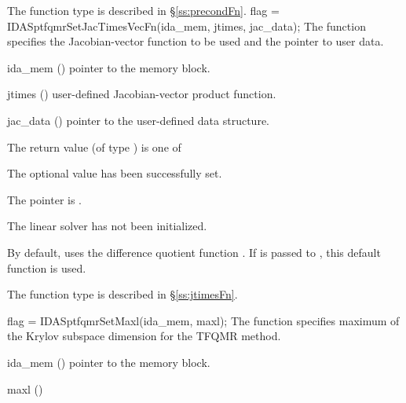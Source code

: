 {{   The function type  is described in \S\ref{ss:precondFn}.
}
{
  flag = IDASptfqmrSetJacTimesVecFn(ida\_mem, jtimes, jac\_data);
}
{
  The function  specifies the Jacobian-vector 
  function to be used and the pointer to user data.
}
{
  \begin{args}
  \item[ida\_mem] ()
    pointer to the {\ida} memory block.
  \item[jtimes] ()
    user-defined Jacobian-vector product function.
  \item[jac\_data] ()
     pointer to the user-defined data structure.
  \end{args}
}
{
  The return value  (of type ) is one of
  \begin{args}
  \item[\Id{IDASPTFQMR\_SUCCESS}] 
    The optional value has been successfully set.
  \item[\Id{IDASPTFQMR\_MEM\_NULL}]
    The  pointer is .
  \item[\Id{IDASPTFQMR\_LMEM\_NULL}]
    The {\idasptfqmr} linear solver has not been initialized.
  \end{args}
}
{
  By default, {\idasptfqmr} uses the difference quotient function .
  If  is passed to , this default function is used.

  The function type  is described in \S\ref{ss:jtimesFn}.
}
{
  flag = IDASptfqmrSetMaxl(ida\_mem, maxl);
}
{
  The function  specifies maximum of the Krylov subspace
  dimension for the TFQMR method.
}
{
  \begin{args}
  \item[ida\_mem] ()
    pointer to the {\ida} memory block.
  \item[maxl] ()


\end{args}}}

